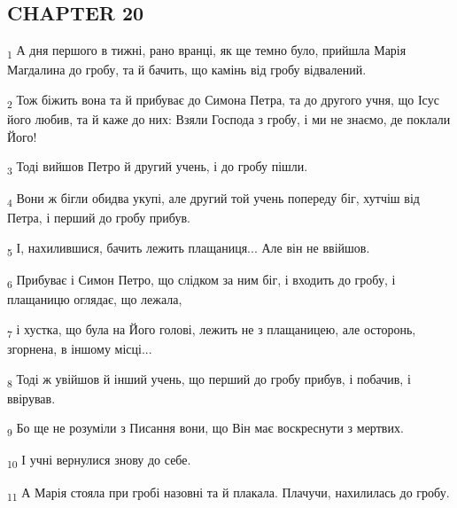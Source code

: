 \subsection{CHAPTER 20}
\begin{tcolorbox}
\textsubscript{1} А дня першого в тижні, рано вранці, як ще темно було, прийшла Марія Магдалина до гробу, та й бачить, що камінь від гробу відвалений.
\end{tcolorbox}
\begin{tcolorbox}
\textsubscript{2} Тож біжить вона та й прибуває до Симона Петра, та до другого учня, що Ісус його любив, та й каже до них: Взяли Господа з гробу, і ми не знаємо, де поклали Його!
\end{tcolorbox}
\begin{tcolorbox}
\textsubscript{3} Тоді вийшов Петро й другий учень, і до гробу пішли.
\end{tcolorbox}
\begin{tcolorbox}
\textsubscript{4} Вони ж бігли обидва укупі, але другий той учень попереду біг, хутчіш від Петра, і перший до гробу прибув.
\end{tcolorbox}
\begin{tcolorbox}
\textsubscript{5} І, нахилившися, бачить лежить плащаниця... Але він не ввійшов.
\end{tcolorbox}
\begin{tcolorbox}
\textsubscript{6} Прибуває і Симон Петро, що слідком за ним біг, і входить до гробу, і плащаницю оглядає, що лежала,
\end{tcolorbox}
\begin{tcolorbox}
\textsubscript{7} і хустка, що була на Його голові, лежить не з плащаницею, але осторонь, згорнена, в іншому місці...
\end{tcolorbox}
\begin{tcolorbox}
\textsubscript{8} Тоді ж увійшов й інший учень, що перший до гробу прибув, і побачив, і ввірував.
\end{tcolorbox}
\begin{tcolorbox}
\textsubscript{9} Бо ще не розуміли з Писання вони, що Він має воскреснути з мертвих.
\end{tcolorbox}
\begin{tcolorbox}
\textsubscript{10} І учні вернулися знову до себе.
\end{tcolorbox}
\begin{tcolorbox}
\textsubscript{11} А Марія стояла при гробі назовні та й плакала. Плачучи, нахилилась до гробу.
\end{tcolorbox}
